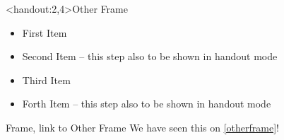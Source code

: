 \documentclass[handout]{beamer}
\begin{document}
\begin{frame}<handout:2,4>{Other Frame}
    \label{otherframe}
  \begin{itemize}[<all:+->]
    \item First Item
    \item Second Item -- this step also to be shown in handout mode
    \item Third Item
    \item Forth Item  -- this step also to be shown in handout mode
  \end{itemize}
\end{frame}

\begin{frame}{Frame, link to Other Frame}
  We have seen this on \ref{otherframe}! %
\end{frame}
\end{document}
